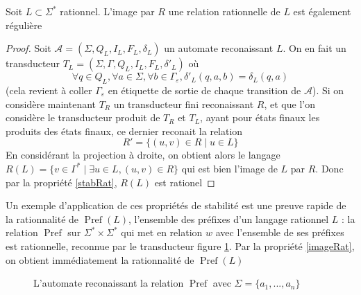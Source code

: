 \documentclass{scrartcl}
\begin{document}
\begin{flushleft}
\begin{prop} \label{imageRat}
    Soit $L \subset \Sigma^*$ rationnel. L'image par $R$ une relation rationnelle de $L$ est également régulière
\end{prop}

\begin{proof}
    Soit $\mathcal{A} = (\Sigma, Q_L, I_L, F_L, \delta_L)$ un automate reconaissant $L$. On en fait un transducteur
    $T_L = (\Sigma, \Gamma, Q_L, I_L, F_L, \delta'_L)$ où
    \[ \forall q \in Q_L, \forall a \in \Sigma, \forall b \in \Gamma_{\varepsilon}, \delta'_L(q, a, b) = \delta_L(q, a) \]
    (cela revient à coller $\Gamma_{\varepsilon}$ en étiquette de sortie de chaque transition de $\mathcal{A}$). Si on considère
    maintenant $T_R$ un transducteur fini reconaissant $R$, et que l'on considère le transducteur produit de $T_R$ et $T_L$,
    ayant pour états finaux les produits des états finaux, ce dernier reconait la relation
    \[ R' = \{ (u, v) \in R \mid u \in L \} \]
    En considérant la projection à droite, on obtient alors le langage $R(L) = \{ v \in \Gamma^* \mid \exists u \in L, (u, v) \in R \}$
    qui est bien l'image de $L$ par $R$. Donc par la propriété \ref{stabRat}, $R(L)$ est rationel
\end{proof}

Un exemple d'application de ces propriétés de stabilité est une preuve rapide de la rationnalité de $\operatorname*{Pref}(L)$, l'ensemble des préfixes
d'un langage rationnel $L$ : la relation $\operatorname*{Pref}$ sur $\Sigma^* \times \Sigma^*$ qui met en relation $w$ avec l'ensemble de
ses préfixes est rationnelle, reconnue par le transducteur figure \ref{transPref}. Par la propriété \ref{imageRat}, on obtient immédiatement la rationnalité de 
$\operatorname*{Pref}(L)$

\begin{figure}[h]
    \caption{L'automate reconaissant la relation $\operatorname*{Pref}$ avec $\Sigma = \{a_1, ..., a_n\}$} \label{transPref}
    \begin{center}
    \end{center}
\end{figure}


\end{flushleft}
\end{document}
